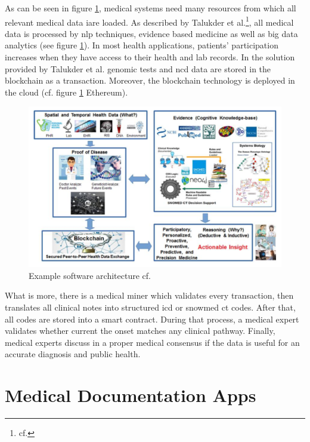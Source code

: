 As can be seen in figure \ref{example_software_architecture}, medical systems need many resources from which all relevant medical data iare loaded. As described by Talukder et al.\footnote{cf.\autocite{talukder}}, all medical data is processed by \ac{nlp} techniques, evidence based medicine as well as big data analytics (see figure \ref{example_software_architecture}).
In most health applications, patients' participation increases when they have access to their health and lab records. In the solution provided by Talukder et al. genomic tests and \ac{ncd} data are stored in the blockchain as a transaction.
Moreover, the blockchain technology is deployed in the cloud (cf. figure \ref{example_software_architecture} Ethereum).

\begin{figure}[htbp]
	\centering
	\includegraphics[width=1\textwidth]{images/example_software_architecture.png}
	\caption{Example software architecture cf.\autocite{talukder}}
	\label{example_software_architecture}
\end{figure}

What is more, there is a medical miner which validates every transaction, then translates all clinical notes into structured \ac{icd} or \ac{snowmed ct} codes. After that, all codes are stored into a smart contract. During that process, a medical expert validates whether current the onset matches any clinical pathway. 
Finally, medical experts discuss in a proper medical consensus if the data is useful for an accurate diagnosis and public health.

\section{Medical Documentation Apps}

